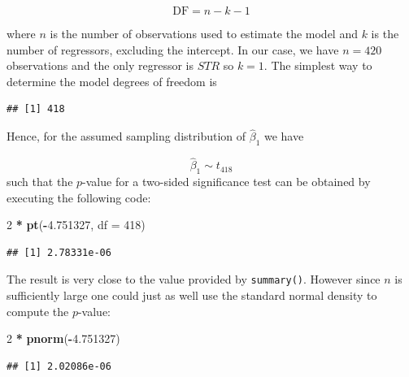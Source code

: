 \documentclass[]{book}
\newenvironment{Shaded}{\begin{snugshade}}{\end{snugshade}}
\newcommand{\KeywordTok}[1]{\textcolor[rgb]{0.13,0.29,0.53}{\textbf{#1}}}
\newcommand{\DataTypeTok}[1]{\textcolor[rgb]{0.13,0.29,0.53}{#1}}
\newcommand{\DecValTok}[1]{\textcolor[rgb]{0.00,0.00,0.81}{#1}}
\newcommand{\FloatTok}[1]{\textcolor[rgb]{0.00,0.00,0.81}{#1}}
\newcommand{\StringTok}[1]{\textcolor[rgb]{0.31,0.60,0.02}{#1}}
\newcommand{\CommentTok}[1]{\textcolor[rgb]{0.56,0.35,0.01}{\textit{#1}}}
\newcommand{\OperatorTok}[1]{\textcolor[rgb]{0.81,0.36,0.00}{\textbf{#1}}}
\newcommand{\NormalTok}[1]{#1}
\theoremstyle{definition}
\theoremstyle{definition}
\theoremstyle{definition}
\theoremstyle{remark}
\begin{document}
\[ \text{DF} = n - k - 1 \]

where \(n\) is the number of observations used to estimate the model and
\(k\) is the number of regressors, excluding the intercept. In our case,
we have \(n=420\) observations and the only regressor is \(STR\) so
\(k=1\). The simplest way to determine the model degrees of freedom is

\begin{Shaded}
\end{Shaded}

\begin{verbatim}
## [1] 418
\end{verbatim}

Hence, for the assumed sampling distribution of \(\hat\beta_1\) we have

\[\hat\beta_1 \sim t_{418}\] such that the \(p\)-value for a two-sided
significance test can be obtained by executing the following code:

\begin{Shaded}
\begin{Highlighting}[]
\DecValTok{2} \OperatorTok{*}\StringTok{ }\KeywordTok{pt}\NormalTok{(}\OperatorTok{-}\FloatTok{4.751327}\NormalTok{, }\DataTypeTok{df =} \DecValTok{418}\NormalTok{)}
\end{Highlighting}
\end{Shaded}

\begin{verbatim}
## [1] 2.78331e-06
\end{verbatim}

The result is very close to the value provided by \texttt{summary()}.
However since \(n\) is sufficiently large one could just as well use the
standard normal density to compute the \(p\)-value:

\begin{Shaded}
\begin{Highlighting}[]
\DecValTok{2} \OperatorTok{*}\StringTok{ }\KeywordTok{pnorm}\NormalTok{(}\OperatorTok{-}\FloatTok{4.751327}\NormalTok{)}
\end{Highlighting}
\end{Shaded}

\begin{verbatim}
## [1] 2.02086e-06
\end{verbatim}
\end{document}
